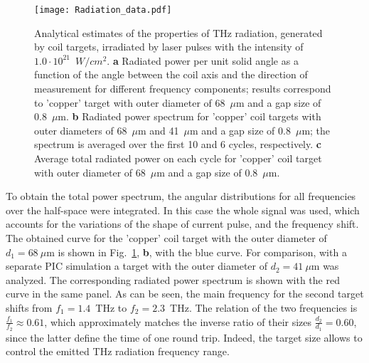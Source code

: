 \documentclass[aps,prl,twocolumn,superscriptaddress]{revtex4-1}
\begin{document}
\begin{figure}
    \centering
    \texttt{[image: Radiation\_data.pdf]}
    \caption{Analytical estimates of the properties of THz radiation, generated by coil targets, irradiated by laser pulses with the intensity of $1.0 \cdot 10^{21}$~$W/cm^2$. \textbf{a} Radiated power per unit solid angle as a function of the angle between the coil axis and the direction of measurement for different frequency components; results correspond to 'copper' target with outer diameter of 68~$\mu$m and a gap size of 0.8~$\mu$m. \textbf{b} Radiated power spectrum for 'copper' coil targets with outer diameters of 68~$\mu$m and 41~$\mu$m and a gap size of 0.8~$\mu$m; the spectrum is averaged over the first 10 and 6 cycles, respectively. \textbf{c} Average total radiated power on each cycle for 'copper' coil target with outer diameter of 68~$\mu$m and a gap size of 0.8~$\mu$m.}
    \label{fig:radiation_data}
\end{figure}

To obtain the total power spectrum, the angular distributions for all frequencies over the half-space were integrated. In this case the whole signal was used, which accounts for the variations of the shape of current pulse, and the frequency shift. The obtained curve for the 'copper' coil target with the outer diameter of $d_1=68~\mu$m is shown in Fig.~\ref{fig:radiation_data}, \textbf{b}, with the blue curve. For comparison, with a separate PIC simulation a target with the outer diameter of $d_2=41~\mu$m was analyzed. The corresponding radiated power spectrum is shown with the red curve in the same panel. As can be seen, the main frequency for the second target shifts from $f_1=1.4$~THz to $f_2=2.3$~THz. The relation of the two frequencies is $\frac{f_1}{f_2} \approx 0.61$, which approximately matches the inverse ratio of their sizes $\frac{d_2}{d_1}=0.60$, since the latter define the time of one round trip. Indeed, the target size allows to control the emitted THz radiation frequency range.
\end{document}
